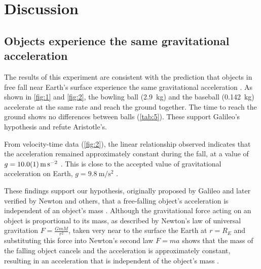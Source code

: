 \documentclass[reprint,amsmath,amssymb,aps,twoside]{revtex4-2}
\begin{document}









\section{Discussion}

\subsection{Objects experience the same gravitational acceleration}
The results of this experiment are consistent with the prediction that objects in free fall near Earth’s surface experience the same gravitational acceleration \cite{tipler,openstax,barrons}. As shown in \cref{fig:1} and \cref{fig:2}, the bowling ball (\qty{2.9}{\kilo\gram}) and the baseball (\qty{0.142}{\kilo\gram}) accelerate at the same rate and reach the ground together. The time to reach the ground shows no differences between balls (\cref{tab:5}). These support Galileo's hypothesis and refute Aristotle's. 

From velocity-time data (\cref{fig:2}), the linear relationship observed indicates that the acceleration remained approximately constant during the fall, at a value of $g=\qty{10.0\pm0.1}{\meter\per\second\squared}$ . This is close to the accepted value of gravitational acceleration on Earth, $g=\qty{9.8}{\meter\per\second\squared}$ \cite{tipler,openstax,barrons}. 

These findings support our hypothesis, originally proposed by Galileo and later verified by Newton and others, that a free-falling object’s acceleration is independent of an object’s mass \cite{galilei:1638:discorsi,machamer:2021:galileo}. Although the gravitational force acting on an object is proportional to its mass, as described by Newton’s law of universal gravitation $F=\frac{GmM}{r^2}$, taken very near to the surface the Earth at $r=R_E$ and substituting this force into Newton’s second law $F=ma$ shows that the mass of the falling object cancels and the acceleration is approximately constant, resulting in an acceleration that is independent of the object’s mass \cite{tipler,openstax,barrons}.
\end{document}
